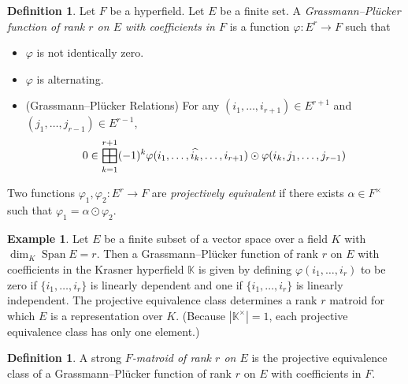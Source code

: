 \documentclass[10pt, preprint]{article}
\theoremstyle{definition}
\newtheorem{definition}[theorem]{Definition}
\newtheorem{example}[theorem]{Example}
\newcommand{\bighplus}{
  \mathop{
    \vphantom{\bigoplus} 
    \mathchoice
      {\vcenter{\hbox{\resizebox{\widthof{$\displaystyle\bigoplus$}}{!}{$\boxplus$}}}}
      {\vcenter{\hbox{\resizebox{\widthof{$\bigoplus$}}{!}{$\boxplus$}}}}
      {\vcenter{\hbox{\resizebox{\widthof{$\scriptstyle\oplus$}}{!}{$\boxplus$}}}}
      {\vcenter{\hbox{\resizebox{\widthof{$\scriptscriptstyle\oplus$}}{!}{$\boxplus$}}}}
  }\displaylimits 
}
\begin{document}
\begin{definition}
\cite{Baker-Bowler} Let $F$ be a hyperfield. Let $E$ be a finite
set. A \emph{Grassmann--Pl\"{u}cker function of rank $r$ on $E$ with
coefficients in $F$} is a function $\varphi : E^{r} \to F$ such that\vspace*{-2pt}
%
\begin{itemize}%
\item
$\varphi $ is not identically zero.
%
\item
$\varphi $ is alternating.
%
\item
(Grassmann--Pl\"{u}cker Relations) For any $(i_{1}, \dots , i_{r+1} )
\in E^{r+1}$ and $(j_{1}, \dots , j_{r-1} ) \in E^{r-1}$,\vspace*{-7pt}
%
\begin{equation*}
0 \in \bighplus _{k=1}^{r+1} (-1)^{k} \varphi (i_{1}, \ldots ,
\widehat{i_{k}}, \ldots , i_{r+1})\odot \varphi ({i_{k},j_{1}, \ldots
, j_{r-1}})
\end{equation*}
%
\end{itemize}
%
\end{definition}

Two functions $\varphi _{1}, \varphi _{2} : E^{r} \to F$ are
\emph{projectively equivalent} if there exists $\alpha \in F^{\times }$
such that $\varphi _{1} = \alpha \odot \varphi _{2}$.\vspace*{-2pt}

\begin{example}
Let $E$ be a finite subset of a vector space over a field $K$ with
\mbox{$\dim _{K} \operatorname{Span}E = r$}. Then a Grassmann--Pl\"{u}cker
function of rank $r$ on $E$ with coefficients in the Krasner hyperfield
$\mathbb{K}$ is given by defining $\varphi (i_{1}, \dots , i_{r})$ to
be zero if $\{i_{1}, \dots , i_{r}\}$ is linearly dependent and one if
$\{i_{1}, \dots , i_{r}\}$ is linearly independent. The projective
equivalence class determines a rank $r$ matroid for which $E$ is a
representation over $K$. (Because $|\mathbb{K}^{\times }|=1$, each
projective equivalence class has only one element.)\vspace*{-2pt}
\end{example}

\begin{definition}
\cite{Baker-Bowler} A strong \emph{$F$-matroid of rank $r$ on
$E$} is the projective equivalence class of a Grassmann--Pl\"{u}cker
function of rank $r$ on $E$ with coefficients in $F$.\vspace*{-2pt}
\end{definition}
\end{document}
